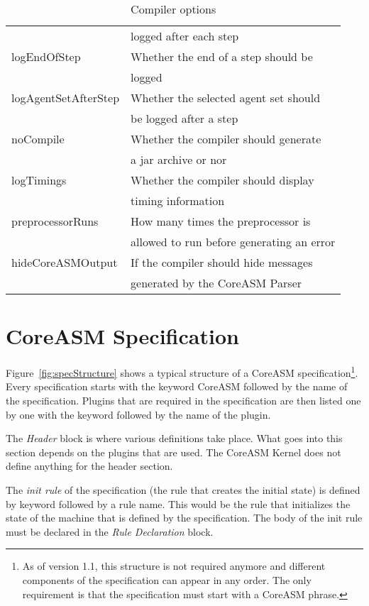 \documentclass{article}
\newcommand{\CoreASM}{{\sffamily CoreASM}\xspace}
\begin{document}
\begin{table}
\begin{tabular}{l l}
													& logged after each step\\
logEndOfStep 							& Whether the end of a step should be\\ 
													& logged\\
logAgentSetAfterStep 			& Whether the selected agent set should\\ 
													& be logged after a step\\
noCompile 								& Whether the compiler should generate\\ 
													& a jar archive or nor\\
logTimings 								& Whether the compiler should display\\ 
													& timing information\\
preprocessorRuns 					& How many times the preprocessor is\\ 
													& allowed to run before generating an error\\
hideCoreASMOutput 				& If the compiler should hide messages\\ 
													& generated by the CoreASM Parser\\
\end{tabular}
\caption{Compiler options}
\label{tab:compiler}
\end{table}

\section{\CoreASM Specification}


Figure~\ref{fig:specStructure} shows a typical structure of a \CoreASM specification\footnote{
As of version 1.1, this structure is not required anymore and different components of the specification
can appear in any order. The only requirement is that the specification must start with a \CoreASM
phrase.}.
Every specification starts with the keyword \CoreASM\index{CoreASM@\CoreASM} followed by the name
of the specification. Plugins that are required in the specification are then listed one by 
one with the keyword  followed by the name of the plugin. 

The \emph{Header} block is where various definitions take place. What goes into this  
section depends on the plugins that are used. The \CoreASM Kernel 
does not define anything for the header section. 

The \emph{init rule} of the specification (the rule
that creates the initial state) is defined by keyword 
 followed
by a rule name. This would be the rule that initializes the state of the machine
that is defined by the specification. The body of the init rule must be declared
in the \emph{Rule Declaration} block.
\end{document}
